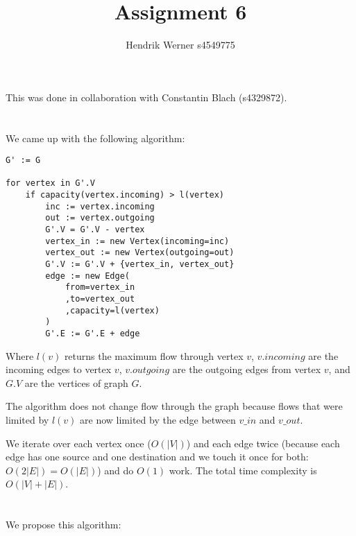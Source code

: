 \documentclass[12pt]{article}
\title {Assignment 6}
\author {Hendrik Werner s4549775}
\begin{document}
\maketitle

This was done in collaboration with Constantin Blach (s4329872).

\section{} %
\section{} %
We came up with the following algorithm:

\begin{lstlisting}
G' := G

for vertex in G'.V
	if capacity(vertex.incoming) > l(vertex)
		inc := vertex.incoming
		out := vertex.outgoing
		G'.V = G'.V - vertex
		vertex_in := new Vertex(incoming=inc)
		vertex_out := new Vertex(outgoing=out)
		G'.V := G'.V + {vertex_in, vertex_out}
		edge := new Edge(
			from=vertex_in
			,to=vertex_out
			,capacity=l(vertex)
		)
		G'.E := G'.E + edge
\end{lstlisting}

Where $l(v)$ returns the maximum flow through vertex $v$, $v.incoming$ are the incoming edges to vertex $v$, $v.outgoing$ are the outgoing edges from vertex $v$, and $G.V$ are the vertices of graph $G$.

The algorithm does not change flow through the graph because flows that were limited by $l(v)$ are now limited by the edge between $v\_in$ and $v\_out$.

We iterate over each vertex once ($O(|V|)$) and each edge twice (because each edge has one source and one destination and we touch it once for both: $O(2|E|) = O(|E|)$) and do $O(1)$ work. The total time complexity is $O(|V| + |E|)$.

\section{} %
We propose this algorithm:
\end{document}
